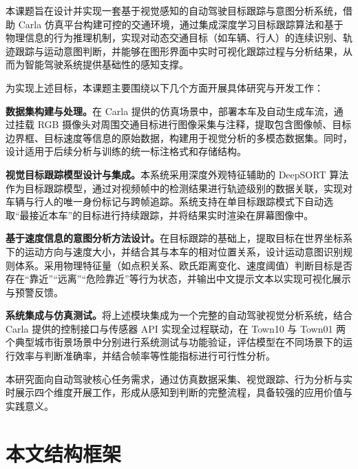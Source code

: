 本课题旨在设计并实现一套基于视觉感知的自动驾驶目标跟踪与意图分析系统，借助 Carla 仿真平台构建可控的交通环境，通过集成深度学习目标跟踪算法和基于物理信息的行为推理机制，实现对动态交通目标（如车辆、行人）的连续识别、轨迹跟踪与运动意图判断，并能够在图形界面中实时可视化跟踪过程与分析结果，从而为智能驾驶系统提供基础性的感知支撑。

为实现上述目标，本课题主要围绕以下几个方面开展具体研究与开发工作：

\textbf{数据集构建与处理。}在 Carla 提供的仿真场景中，部署本车及自动生成车流，通过挂载 RGB 摄像头对周围交通目标进行图像采集与注释，提取包含图像帧、目标边界框、目标速度等信息的原始数据，构建用于视觉分析的多模态数据集。同时，设计适用于后续分析与训练的统一标注格式和存储结构。

\textbf{视觉目标跟踪模型设计与集成。}本系统采用深度外观特征辅助的 DeepSORT 算法作为目标跟踪模型，通过对视频帧中的检测结果进行轨迹级别的数据关联，实现对车辆与行人的唯一身份标记与跨帧追踪。系统支持在单目标跟踪模式下自动选取“最接近本车”的目标进行持续跟踪，并将结果实时渲染在屏幕图像中。

\textbf{基于速度信息的意图分析方法设计。}在目标跟踪的基础上，提取目标在世界坐标系下的运动方向与速度大小，并结合其与本车的相对位置关系，设计运动意图识别规则体系。采用物理特征量（如点积关系、欧氏距离变化、速度阈值）判断目标是否存在“靠近”“远离”“危险靠近”等行为状态，并输出中文提示文本以实现可视化展示与预警反馈。

\textbf{系统集成与仿真测试。}将上述模块集成为一个完整的自动驾驶视觉分析系统，结合 Carla 提供的控制接口与传感器 API 实现全过程联动，在 Town10 与 Town01 两个典型城市街景场景中分别进行系统测试与功能验证，评估模型在不同场景下的运行效率与判断准确率，并结合帧率等性能指标进行可行性分析。

本研究面向自动驾驶核心任务需求，通过仿真数据采集、视觉跟踪、行为分析与实时展示四个维度开展工作，形成从感知到判断的完整流程，具备较强的应用价值与实践意义。

\section{本文结构框架}

